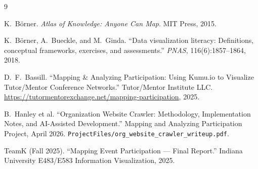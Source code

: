 \documentclass[10pt,twocolumn,letterpaper]{article}
\begin{document}
\begin{thebibliography}{9}

K.\ B\"{o}rner.
\textit{Atlas of Knowledge: Anyone Can Map}.
MIT Press, 2015.

K.\ B\"{o}rner, A.\ Bueckle, and M.\ Ginda.
``Data visualization literacy: Definitions, conceptual frameworks,
exercises, and assessments.''
\textit{PNAS}, 116(6):1857--1864, 2018.

D.\ F.\ Bassill.
``Mapping \& Analyzing Participation: Using Kumu.io to Visualize
Tutor/Mentor Conference Networks.''
Tutor/Mentor Institute LLC.
\url{https://tutormentorexchange.net/mapping-participation}, 2025.

B.\ Hanley et al.
``Organization Website Crawler: Methodology, Implementation Notes,
and AI-Assisted Development.''
Mapping and Analyzing Participation Project, April 2026.
\texttt{ProjectFiles/org\_website\_crawler\_writeup.pdf}.

TeamK (Fall 2025).
``Mapping Event Participation --- Final Report.''
Indiana University E483/E583 Information Visualization, 2025.

\end{thebibliography}
\end{document}
